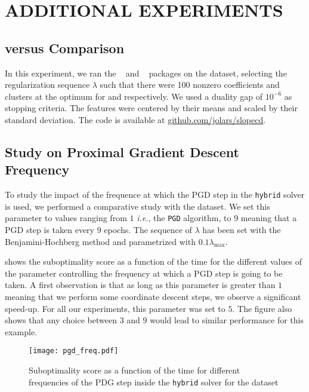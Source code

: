 \section{ADDITIONAL EXPERIMENTS}\label{sec:add_expes}

\subsection{ versus  Comparison}
\label{sec:slope-vs-glmnet}

In this experiment, we ran the ~\parencite{friedman2022} and ~\parencite{larsson2022d} packages on the  dataset, selecting the regularization sequence \(\lambda\) such that there were 100 nonzero coefficients and clusters at the optimum for  and  respectively.
We used a duality gap of \(10^{-6}\) as stopping criteria.
The features were centered by their means and scaled by their standard deviation.
The code is available at \href{https://github.com/jolars/slopecd}{\url{github.com/jolars/slopecd}}.

\subsection{Study on Proximal Gradient Descent Frequency}
\label{sec:pgd-freq-study}

To study the impact of the frequence at which the PGD step in the \texttt{hybrid} solver is used, we performed a comparative study with the  dataset.
We set this parameter to values ranging from $1$ \textit{i.e.}, the \texttt{PGD} algorithm, to 9 meaning that a PGD step is taken every $9$ epochs.
The sequence of $\lambda$ has been set with the Benjamini-Hochberg method and parametrized with $0.1 \lambda_{\text{max}}$.

 shows the suboptimality score as a function of the time for the different values of the parameter controlling the frequency at which a PGD step is going to be taken.
A first observation is that as long as this parameter is greater than $1$ meaning that we perform some coordinate descent steps, we observe a significant speed-up.
For all our experiments, this parameter was set to $5$.
The figure also shows that any choice between $3$ and $9$ would lead to similar performance for this example.

\begin{figure*}[htb]
  \centering
    \texttt{[image: pgd\_freq.pdf]}%
    \caption{Suboptimality score as a function of the time for different frequencies of the PDG step inside the \texttt{hybrid} solver for the  dataset}
  \label{fig:pgd_freq}
\end{figure*}

